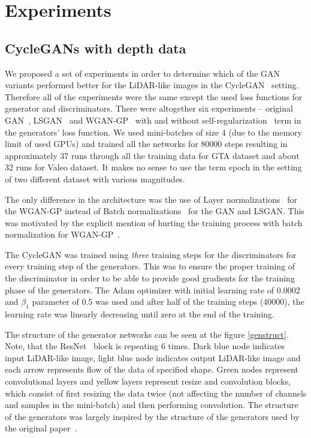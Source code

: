 \chapter{Experiments} \label{experiments}

\section{CycleGANs with depth data}

We proposed a set of experiments in order to determine which of the GAN variants performed better for the LiDAR-like images in the CycleGAN~\cite{cyclegan} setting. Therefore all of the experiments were the same except the used loss functions for generator and discriminators. There were altogether six experiments -- original GAN~\cite{origgan}, LSGAN~\cite{lsgan} and WGAN-GP~\cite{wgan-gp} with and without self-regularization~\cite{historypool} term in the generators' loss function. We used mini-batches of size 4 (due to the memory limit of used GPUs) and trained all the networks for 80000 steps resulting in approximately 37 runs through all the training data for GTA dataset and about 32 runs for Valeo dataset. It makes no sense to use the term epoch in the setting of two different dataset with various magnitudes.

The only difference in the architecture was the use of Layer normalizations~\cite{layernorm} for the WGAN-GP instead of Batch normalizations~\cite{batchnorm} for the GAN and LSGAN. This was motivated by the explicit mention of hurting the training process with batch normalization for WGAN-GP~\cite{wgan-gp}.

The CycleGAN was trained using {\em three} training steps for the discriminators for every training step of the generators. This was to ensure the proper training of the discriminator in order to be able to provide good gradients for the training phase of the generators. The Adam optimizer with initial learning rate of 0.0002 and $\beta_1$ parameter of 0.5 was used and after half of the training steps (40000), the learning rate was linearly decreasing until zero at the end of the training.

The structure of the generator networks can be seen at the figure \ref{genstruct}. Note, that the ResNet~\cite{resnet} block is repeating 6 times. Dark blue node indicates input LiDAR-like image, light blue node indicates output LiDAR-like image and each arrow represents flow of the data of specified shape. Green nodes represent convolutional layers and yellow layers represent resize and convolution blocks, which consist of first resizing the data twice (not affecting the number of channels and samples in the mini-batch) and then performing convolution. The structure of the generators was largely inspired by the structure of the generators used by the original paper~\cite{cyclegan}.

